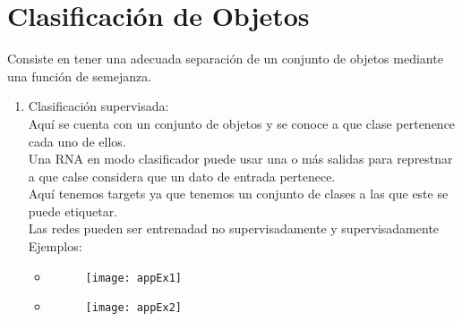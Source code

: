 \documentclass{article}
\begin{document}
\section{Clasificación de Objetos}
Consiste en tener una adecuada separación de un conjunto de objetos mediante una función de semejanza.
\begin{enumerate}
	\item Clasificación supervisada:\\
	Aquí se cuenta con un conjunto de objetos y se conoce a que clase pertenence cada uno de ellos.\\
	Una RNA en modo clasificador puede usar una o más salidas para represtnar a que calse considera que un dato de entrada pertenece.\\
	Aquí tenemos targets ya que tenemos un conjunto de clases a las que este se puede etiquetar.\\
	Las redes pueden ser entrenadad no supervisadamente y supervisadamente\\
	Ejemplos:
	\begin{itemize}
		\item \begin{figure}[h!]
			\texttt{[image: appEx1]}
		\end{figure}
		\item \begin{figure}[h!]
			\texttt{[image: appEx2]}
		\end{figure}
	\end{itemize}

\end{enumerate}
\end{document}
